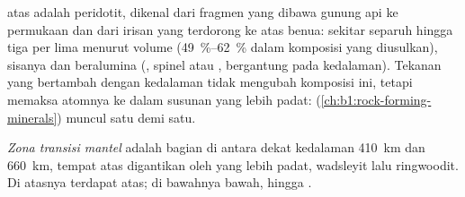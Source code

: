  atas adalah peridotit, dikenal dari fragmen yang dibawa gunung api ke permukaan dan dari irisan  yang terdorong ke atas benua: sekitar separuh hingga tiga per lima  menurut volume (\qtyrange{49}{62}{\percent} dalam komposisi yang diusulkan), sisanya  dan  beralumina (, spinel atau , bergantung pada kedalaman). Tekanan yang bertambah dengan kedalaman tidak mengubah komposisi ini, tetapi memaksa atomnya ke dalam susunan yang lebih padat:  (\cref{ch:b1:rock-forming-minerals}) muncul satu demi satu.

\begin{definition}\label{def:b1:layered-earth:transition-zone}
\emph{Zona transisi mantel} adalah bagian  di antara  dekat kedalaman \qty{410}{km} dan \qty{660}{km}, tempat   atas digantikan oleh  yang lebih padat, wadsleyit lalu ringwoodit. Di atasnya terdapat  atas; di bawahnya  bawah, hingga .
\end{definition}


